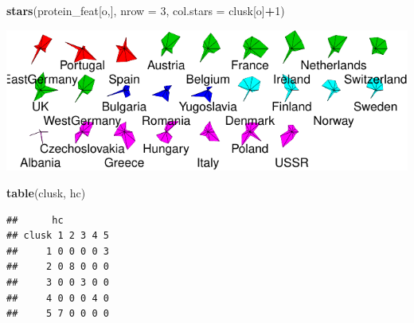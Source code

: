 \documentclass[]{article}
\newenvironment{Shaded}{\begin{snugshade}}{\end{snugshade}}
\newcommand{\DataTypeTok}[1]{\textcolor[rgb]{0.13,0.29,0.53}{#1}}
\newcommand{\DecValTok}[1]{\textcolor[rgb]{0.00,0.00,0.81}{#1}}
\newcommand{\KeywordTok}[1]{\textcolor[rgb]{0.13,0.29,0.53}{\textbf{#1}}}
\newcommand{\NormalTok}[1]{#1}
\newcommand{\OperatorTok}[1]{\textcolor[rgb]{0.81,0.36,0.00}{\textbf{#1}}}
\newcommand{\StringTok}[1]{\textcolor[rgb]{0.31,0.60,0.02}{#1}}
\begin{document}
\begin{Shaded}
\end{Shaded}

\begin{Shaded}
\begin{Highlighting}[]
\KeywordTok{stars}\NormalTok{(protein_feat[o,], }\DataTypeTok{nrow =} \DecValTok{3}\NormalTok{, }\DataTypeTok{col.stars =}\NormalTok{ clusk[o]}\OperatorTok{+}\DecValTok{1}\NormalTok{)}
\end{Highlighting}
\end{Shaded}

\begin{center}\includegraphics{sol_A1_files/figure-latex/unnamed-chunk-13-1} \end{center}

\begin{Shaded}
\begin{Highlighting}[]
\KeywordTok{table}\NormalTok{(clusk, hc)}
\end{Highlighting}
\end{Shaded}

\begin{verbatim}
##      hc
## clusk 1 2 3 4 5
##     1 0 0 0 0 3
##     2 0 8 0 0 0
##     3 0 0 3 0 0
##     4 0 0 0 4 0
##     5 7 0 0 0 0
\end{verbatim}
\end{document}
